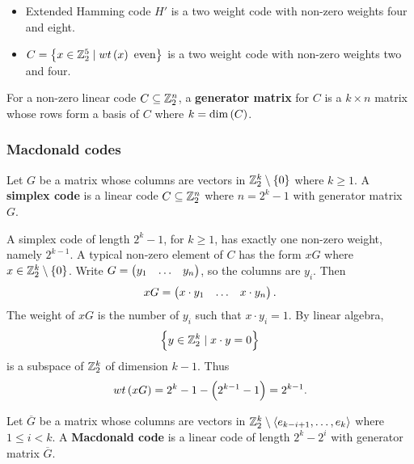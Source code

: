 \begin{example*}
\hfill
\begin{itemize}
\item Extended Hamming code $ H' $ is a two weight code with non-zero weights four and eight.
\item $ C = \cbr{x \in \Z_2^5 \mid wt\br{x} \ \text{even}} $ is a two weight code with non-zero weights two and four.
\end{itemize}
\end{example*}

\begin{definition*}
For a non-zero linear code $ C \subseteq \mathbb{Z}_2^n $, a \textbf{generator matrix} for $ C $ is a $ k \times n $ matrix whose rows form a basis of $ C $ where $ k = \dim\br{C} $.
\end{definition*}

\subsubsection{Macdonald codes}

\begin{definition*}
Let $ G $ be a matrix whose columns are vectors in $ \Z_2^k \setminus \cbr{0} $ where $ k \ge 1 $. A \textbf{simplex code} is a linear code $ C \subseteq \mathbb{Z}_2^n $ where $ n = 2^k - 1 $ with generator matrix $ G $.
\end{definition*}

\begin{fact*}
A simplex code of length $ 2^k - 1 $, for $ k \ge 1 $, has exactly one non-zero weight, namely $ 2^{k - 1} $. A typical non-zero element of $ C $ has the form $ xG $ where $ x \in \Z_2^k \setminus \cbr{0} $. Write $ G = \onebythree{y_1}{\dots}{y_n} $, so the columns are $ y_i $. Then
$$ xG = \onebythree{x \cdot y_1}{\dots}{x \cdot y_n}. $$
The weight of $ xG $ is the number of $ y_i $ such that $ x \cdot y_i = 1 $. By linear algebra,
$$ \cbr{y \in \Z_2^k \mid x \cdot y = 0} $$
is a subspace of $ \mathbb{Z}_2^k $ of dimension $ k - 1 $. Thus
$$ wt\br{xG} = 2^k - 1 - \br{2^{k - 1} - 1} = 2^{k - 1}. $$
\end{fact*}

\begin{definition*}
Let $ \overline{G} $ be a matrix whose columns are vectors in $ \mathbb{Z}_2^k \setminus \left\langle e_{k - i + 1}, \dots, e_k \right\rangle $ where $ 1 \le i < k $. A \textbf{Macdonald code} is a linear code of length $ 2^k - 2^i $ with generator matrix $ \overline{G} $.
\end{definition*}

